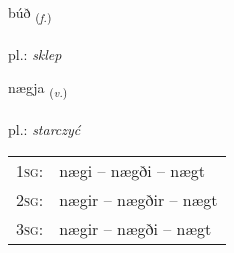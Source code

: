 \documentclass[frontgrid, backgrid]{flacards}\usepackage[]{graphicx}\usepackage[]{xcolor}
\begin{document}
\renewcommand{\flhead}{\vskip5pt \fboxsep=0pt {\small\bfseries\footnotesize Nafnorð | Noun}}
\renewcommand{\fcfoot}{\vskip5pt \fboxsep=0pt \hspace{2pt}{\small\bfseries\footnotesize 2K}}

\renewcommand{\blhead}{\vskip5pt {\small\bfseries\footnotesize Nafnorð | Noun }}
\renewcommand{\bcfoot}{\vskip5pt \hspace{2pt}{\small\bfseries\footnotesize 2K}}


{búð \small{\textsubscript{(\textit{f.})}} \\[1ex] %
\textphonetic{[puːð]} \\
pl.: \emph{sklep} \\  [2ex]
\renewcommand*{\arraystretch}{0.8}
}

\renewcommand{\flhead}{\vskip5pt \fboxsep=0pt {\small\bfseries\footnotesize Sagnorð | Verb}}
\renewcommand{\fcfoot}{\vskip5pt \fboxsep=0pt \hspace{2pt}{\small\bfseries\footnotesize 2K}}

\renewcommand{\blhead}{\vskip5pt {\small\bfseries\footnotesize Sagnorð | Verb }}
\renewcommand{\bcfoot}{\vskip5pt \hspace{2pt}{\small\bfseries\footnotesize 2K}}


{nægja \small{\textsubscript{(\textit{v.})}} \\[1ex] %
\textphonetic{[naiːja]} \\
pl.: \emph{starczyć} \\  [2ex]
\renewcommand*{\arraystretch}{0.8}
\begin{tabular}{p{1cm}l}
\textsc{1sg}: & nægi -- nægði -- nægt \\ 
\textsc{2sg}: & nægir -- nægðir -- nægt \\ 
\textsc{3sg}: & nægir -- nægði -- nægt \\ 
\end{tabular}
}
\end{document}
